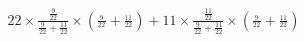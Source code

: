 \documentclass[preview]{standalone}
\begin{document}
\begin{align*}
22 \times \frac{\frac{9}{22}}{\frac{9}{22}+\frac{11}{22}} \times (\frac{_9}{^{22}}+\frac{_{11}}{^{22}}) + 11 \times \frac{\frac{11}{22}}{\frac{9}{22}+\frac{11}{22}} \times (\frac{_9}{^{22}}+\frac{_{11}}{^{22}})
\end{align*}
\end{document}
